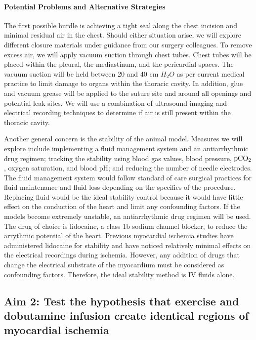 \paragraph{Potential Problems and Alternative Strategies} The first possible hurdle is achieving a tight seal along the chest incision and minimal residual air in the chest.  Should either situation arise, we will explore different closure materials under guidance from our surgery colleagues. To remove excess air, we will apply vacuum suction through chest tubes. Chest tubes will be placed within the pleural, the mediastinum, and the pericardial spaces. The vacuum suction will be held between 20 and 40 cm $H_2O$ as per current medical practice to limit damage to organs within the thoracic cavity. In addition, glue and vacuum grease will be applied to the suture site and around all openings and potential leak sites. We will use a combination of ultrasound imaging and electrical recording techniques to determine if air is still present within the thoracic cavity. 

Another general concern is the stability of the animal model. Measures we will explore include implementing a fluid management system and an antiarrhythmic drug regimen; tracking the stability using blood gas values, blood pressure, ${\rm pCO_2}$, oxygen saturation, and blood pH; and reducing the number of needle electrodes. The fluid management system would follow standard of care surgical practices for fluid maintenance and fluid loss depending on the specifics of the procedure. Replacing fluid would be the ideal stability control because it would have little effect on the conduction of the heart and limit any confounding factors. If the models become extremely unstable, an antiarrhythmic drug regimen will be used. The drug of choice is lidocaine, a class 1b sodium channel blocker, to reduce the arrythmic potential of the heart. Previous myocardial ischemia studies have administered lidocaine for stability and have noticed relatively minimal effects on the electrical recordings during ischemia. However, any addition of drugs that change the electrical substrate of the myocardium must be considered as confounding factors. Therefore, the ideal stability method is IV fluids alone. 


\subsection{Aim 2: Test the hypothesis that exercise and dobutamine infusion create identical regions of myocardial ischemia}

